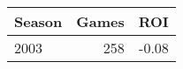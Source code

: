 \begin{table}[t]
\centering
\small
\begin{tabular}{lrr}
\toprule
Season & Games & ROI \\
\midrule
2003 & 258 & -0.08 \\
\bottomrule
\end{tabular}
\end{table}
